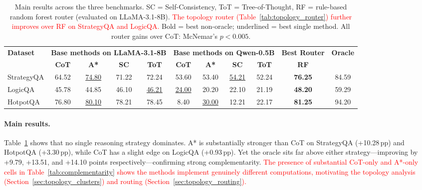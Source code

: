 \documentclass[11pt]{article}
\begin{document}
\begin{table}[t]
\centering
\small
\setlength{\tabcolsep}{5pt}
\begin{tabular}{lcccccccccc}
\toprule
\multirow{2}{*}{\textbf{Dataset}} 
& \multicolumn{4}{c}{\textbf{Base methods on LLaMA-3.1-8B}} 
& \multicolumn{4}{c}{\textbf{Base methods on Qwen-0.5B}} 
& \multicolumn{1}{c}{\textbf{Best Router}} 
& \multirow{2}{*}{\textbf{Oracle}} \\
\cmidrule(lr){2-5} \cmidrule(lr){6-9} \cmidrule(lr){10-10}
& \textbf{CoT} & \textbf{A*} & \textbf{SC} & \textbf{ToT}
& \textbf{CoT} & \textbf{A*} & \textbf{SC} & \textbf{ToT}
& \textbf{RF} & \\
\midrule
StrategyQA 
& 64.52 & \underline{74.80} & 71.22 & 72.24 
& 53.60 & 53.40 & \underline{54.21} & 52.24 
& \textbf{76.25} & 84.59 \\

LogicQA 
& 45.78 & 44.85 & 46.10 & \underline{46.21}
& \underline{24.00} & 20.20 & 22.10 & 21.19 
& \textbf{48.20} & 59.29 \\

HotpotQA 
& 76.80 & \underline{80.10} & 78.21 & 78.45 
& 8.40 & \underline{30.00} & 12.21 & 22.17 
& \textbf{81.25} & 94.20 \\
\bottomrule
\end{tabular}
\caption{Main results across the three benchmarks. SC = Self-Consistency, ToT = Tree-of-Thought, RF = rule-based random forest router (evaluated on LLaMA-3.1-8B). \textcolor{red}{The topology router (Table~\ref{tab:topology_router}) further improves over RF on StrategyQA and LogicQA.} Bold = best non-oracle; underlined = best single method. All router gains over CoT: McNemar's $p<0.005$.}
\label{tab:main}
\end{table}


\paragraph{Main results.}
Table~\ref{tab:main} shows that no single reasoning strategy dominates. A* is substantially stronger than CoT on StrategyQA (+10.28\,pp) and HotpotQA (+3.30\,pp), while CoT has a slight edge on LogicQA (+0.93\,pp). Yet the oracle sits far above either strategy---improving by +9.79, +13.51, and +14.10 points respectively---confirming strong complementarity. \textcolor{red}{The presence of substantial CoT-only and A*-only cells in Table~\ref{tab:complementarity} shows the methods implement genuinely different computations, motivating the topology analysis (Section~\ref{sec:topology_clusters}) and routing (Section~\ref{sec:topology_routing}).}
\end{document}
